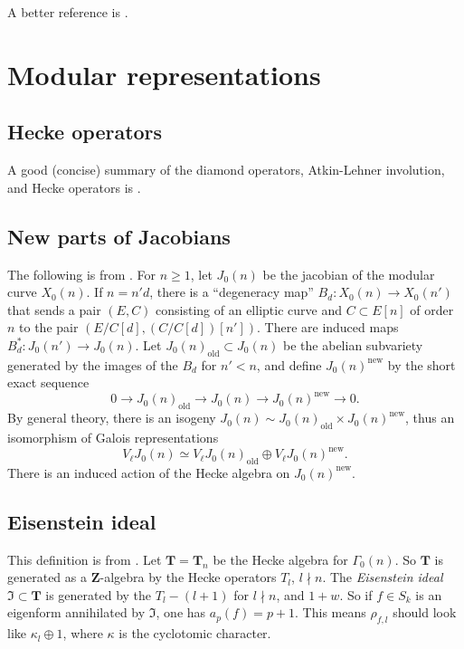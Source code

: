 \documentclass{amsart}
\newcommand{\dT}{\mathbf{T}}
\newcommand{\dZ}{\mathbf{Z}}
\newcommand{\fI}{\mathfrak{I}}
\begin{document}
A better reference is \cite[1.7]{serre-1972}. 





\section{Modular representations}


\subsection{Hecke operators}

A good (concise) summary of the diamond operators, Atkin-Lehner involution, and 
Hecke operators is \cite[ch.2 \S 5]{mw84}. 


\subsection{New parts of Jacobians}

The following is from \cite[\S 2]{mazur-1978}. 
For $n\geqslant 1$, let $J_0(n)$ be the jacobian of the modular curve $X_0(n)$. 
If $n=n' d$, there is a ``degeneracy map'' $B_d:X_0(n)\to X_0(n')$ that sends a 
pair $(E,C)$ consisting of an elliptic curve and $C\subset E[n]$ of order $n$ 
to the pair $(E/C[d],(C/C[d])[n'])$. There are induced maps 
$B_d^\ast:J_0(n')\to J_0(n)$. Let $J_0(n)_\mathrm{old}\subset J_0(n)$ be the 
abelian subvariety generated by the images of the $B_d$ for $n'<n$, and define 
$J_0(n)^\mathrm{new}$ by the short exact sequence 
\[
  0 \to J_0(n)_\mathrm{old} \to J_0(n) \to J_0(n)^\mathrm{new} \to 0 .
\]
By general theory, there is an isogeny 
$J_0(n)\sim J_0(n)_\mathrm{old}\times J_0(n)^\mathrm{new}$, thus an isomorphism 
of Galois representations 
\[
  V_\ell J_0(n) \simeq V_\ell J_0(n)_\mathrm{old}\oplus V_\ell J_0(n)^\mathrm{new} .
\]
There is an induced action of the Hecke algebra on $J_0(n)^\mathrm{new}$. 


\subsection{Eisenstein ideal}

This definition is from \cite[II.9]{mazur-1977}. Let $\dT=\dT_n$ be the Hecke 
algebra for $\Gamma_0(n)$. So $\dT$ is generated as a $\dZ$-algebra by the 
Hecke operators $T_l$, $l\nmid n$. The \emph{Eisenstein ideal} 
$\fI\subset \dT$ is generated by the $T_l-(l+1)$ for $l\nmid n$, and 
$1+w$. So if $f\in S_k$ is an eigenform annihilated by $\fI$, one has 
$a_p(f) = p+1$. This means $\rho_{f,l}$ should look like 
$\kappa_l\oplus 1$, where $\kappa$ is the cyclotomic character. 
\end{document}
